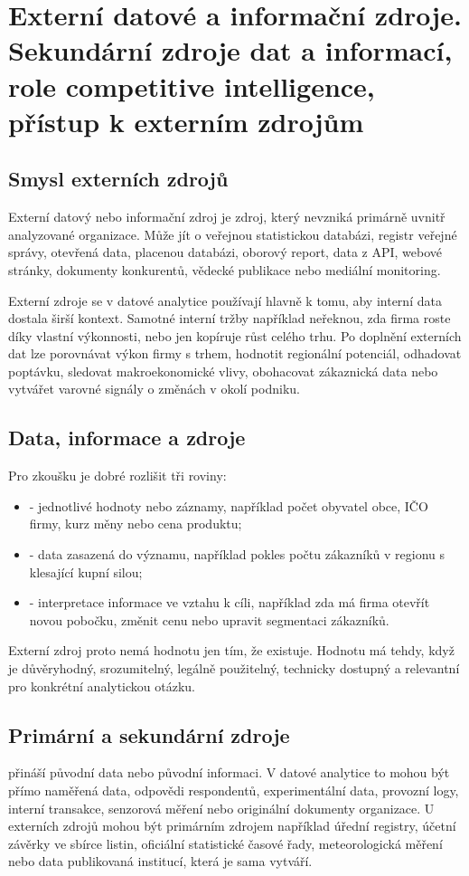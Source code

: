 \section{Externí datové a informační zdroje. Sekundární zdroje dat a informací, role competitive intelligence, přístup k externím zdrojům}

\subsection{Smysl externích zdrojů}
Externí datový nebo informační zdroj je zdroj, který nevzniká primárně uvnitř analyzované organizace.
Může jít o veřejnou statistickou databázi, registr veřejné správy, otevřená data, placenou databázi,
oborový report, data z API, webové stránky, dokumenty konkurentů, vědecké publikace nebo mediální
monitoring.

Externí zdroje se v datové analytice používají hlavně k tomu, aby interní data dostala širší kontext.
Samotné interní tržby například neřeknou, zda firma roste díky vlastní výkonnosti, nebo jen kopíruje
růst celého trhu. Po doplnění externích dat lze porovnávat výkon firmy s trhem, hodnotit regionální
potenciál, odhadovat poptávku, sledovat makroekonomické vlivy, obohacovat zákaznická data nebo
vytvářet varovné signály o změnách v okolí podniku.

\subsection{Data, informace a zdroje}
Pro zkoušku je dobré rozlišit tři roviny:
\begin{itemize}
  \item {} - jednotlivé hodnoty nebo záznamy, například počet obyvatel obce, IČO firmy,
  kurz měny nebo cena produktu;
  \item {} - data zasazená do významu, například pokles počtu zákazníků v regionu
  s klesající kupní silou;
  \item {} - interpretace informace ve vztahu k cíli, například zda má
  firma otevřít novou pobočku, změnit cenu nebo upravit segmentaci zákazníků.
\end{itemize}

Externí zdroj proto nemá hodnotu jen tím, že existuje. Hodnotu má tehdy, když je důvěryhodný,
srozumitelný, legálně použitelný, technicky dostupný a relevantní pro konkrétní analytickou otázku.

\subsection{Primární a sekundární zdroje}
 přináší původní data nebo původní informaci. V datové analytice to mohou být
přímo naměřená data, odpovědi respondentů, experimentální data, provozní logy, interní transakce,
senzorová měření nebo originální dokumenty organizace. U externích zdrojů mohou být primárním zdrojem
například úřední registry, účetní závěrky ve sbírce listin, oficiální statistické časové řady,
meteorologická měření nebo data publikovaná institucí, která je sama vytváří.


